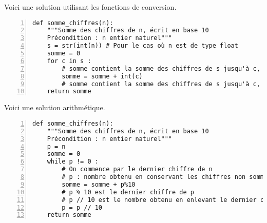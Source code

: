 \exer{}
\setcounter{numques}{0}

Voici une solution utilisant les fonctions de conversion.
\begin{Verbatim}[gobble=0,numbers=left]
def somme_chiffres(n):
    """Somme des chiffres de n, écrit en base 10
    Précondition : n entier naturel"""
    s = str(int(n)) # Pour le cas où n est de type float
    somme = 0
    for c in s :
        # somme contient la somme des chiffres de s jusqu'à c, exclu
        somme = somme + int(c)
        # somme contient la somme des chiffres de s jusqu'à c, inclu
    return somme
\end{Verbatim}
Voici une solution arithmétique.
\begin{Verbatim}[gobble=0,numbers=left]
def somme_chiffres(n):
    """Somme des chiffres de n, écrit en base 10
    Précondition : n entier naturel"""
    p = n
    somme = 0 
    while p != 0 : 
        # On commence par le dernier chiffre de n
        # p : nombre obtenu en conservant les chiffres non sommés
        somme = somme + p%10
        # p % 10 est le dernier chiffre de p
        # p // 10 est le nombre obtenu en enlevant le dernier chiffre de p
        p = p // 10
    return somme
\end{Verbatim}